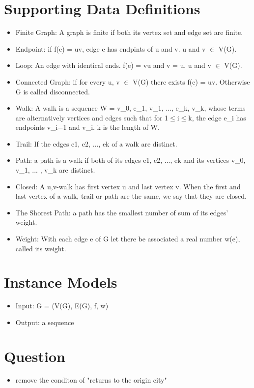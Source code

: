 \documentclass[12pt]{article}
\begin{document}
\section{Supporting Data Definitions}
\begin{itemize}
    \item Finite Graph: A graph is finite if both its vertex set and edge set are finite.
    \item Endpoint: if f(e) = uv, edge e has endpints of u and v. u and v $\in$  V(G).
    \item Loop: An edge with identical ends. f(e) = vu and v = u. u and v $\in$  V(G).
    \item Connected Graph: if for every u, v $\in$  V(G) there exists f(e) = uv. Otherwise G is called disconnected.
    \item Walk: A walk is a sequence W = {v\_0, e\_1, v\_1, $...$, e\_k, v\_k}, whose terms are alternatively vertices 
    and edges such that for 1$\le$i$\le$k, the edge e\_i has endpoints v\_{i$-$1} and v\_i. k is the length of W.
    \item Trail: If the edges e1, e2, $...$, ek of a walk are distinct.
    \item Path: a path is a walk if both of its edges e1, e2, $...$, ek and its vertices v\_0, v\_1, $...$ , v\_k are distinct.
    \item Closed: A u,v-walk has first vertex u and last vertex v. 
    When the first and last vertex of a walk, trail or path are the same, we say that they are closed. 
    \item The Shorest Path: a path has the smallest number of sum of its edges' weight.
    \item Weight: With each edge e of G let there be associated a real number w(e), called its weight.
\end{itemize}

\section{Instance Models}
\begin{itemize}
    \item Input: G = (V(G), E(G), f, w)
    \item Output: a sequence
\end{itemize}

\section{Question}
\begin{itemize}
    \item remove the conditon of "returns to the origin city"
\end{itemize}
\end{document}

